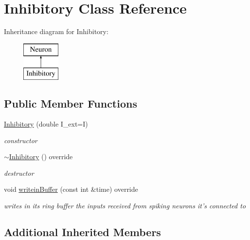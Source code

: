 \hypertarget{classInhibitory}{\section{Inhibitory Class Reference}
\label{classInhibitory}
}
Inheritance diagram for Inhibitory\-:\begin{figure}[H]
\begin{center}
\leavevmode
\includegraphics[height=2.000000cm]{classInhibitory}
\end{center}
\end{figure}
\subsection*{Public Member Functions}
\begin{DoxyCompactItemize}
\item 
\hyperlink{classInhibitory_acb4d1d9eaf926ad89a87a110eeda8516}{Inhibitory} (double I\-\_\-ext=I)
\begin{DoxyCompactList}\small\item\em constructor \end{DoxyCompactList}\item 
\hyperlink{classInhibitory_a790c9bdaecdd9fe967caf2833e6eea93}{$\sim$\-Inhibitory} () override
\begin{DoxyCompactList}\small\item\em destructor \end{DoxyCompactList}\item 
void \hyperlink{classInhibitory_a126f7fedd52892995a2017319ee23470}{writein\-Buffer} (const int \&time) override
\begin{DoxyCompactList}\small\item\em writes in its ring buffer the inputs received from spiking neurons it's connected to \end{DoxyCompactList}\end{DoxyCompactItemize}
\subsection*{Additional Inherited Members}


